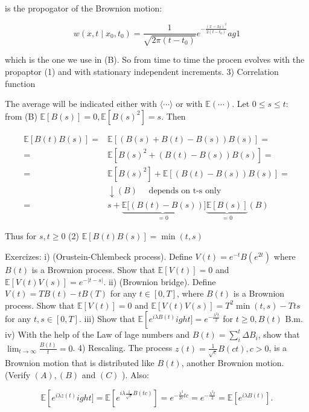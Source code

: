 is the propogator of the Brownion motion:


\begin{equation*} w\left(x, t \mid x_{0}, t_{0}\right)=\frac{1}{\sqrt{2 \pi\left(t-t_{0}\right)}} e^{-\frac{\left(x-x_{0}\right)^{2}}{2\left(t-t_{0}\right)}} 	ag{1}
\end{equation*} 


which is the one we use in (B). So from time to time the procen evolves with the propaptor (1) and with stationary independent increments.
3) Correlation function

The average will be indicated either with $\langle\cdots\rangle$ or with $\mathbb{E}(\cdots)$. Let $0 \leqslant s \leqslant t:$ from (B) $\mathbb{E}[B(s)]=0, \mathbb{E}
\left[B(s)^{2}\right]=s$. Then

$$ \begin{aligned}
\mathbb{E}[B(t) B(s)]= & \mathbb{E}[(B(s)+B(t)-B(s)) B(s)]=\\
= & \mathbb{E}
\left[B(s)^{2}+(B(t)-B(s)) B(s)\right]=\\
= & \mathbb{E}
\left[B(s)^{2}\right]+\mathbb{E}[(B(t)-B(s)) B(s)]=\\
& \downarrow(B) \quad \text { depends on t-s only }
\\
= & s+\underbrace{\mathbb{E}[(B(t)-B(s))}_{=0}] \underbrace{\mathbb{E}[B(s)]}_{=0}(B)
\end{aligned} $$

Thus for $s, t \geqslant 0$
(2) $\mathbb{E}[B(t) B(s)]=\min (t, s)$

Exercizes: i) (Orustein-Chlembeck process). Define $V(t)=e^{-t} B\left(e^{2 t}\right)$ where $B(t)$ is a Brownion process. Show that $\mathbb{E}[V(t)]=0$ and $\mathbb{E}[V(t) V(s)]=e^{-|t-s|}$.
ii) (Brownion bridge). Define $V(t)=T B(t)-t B(T)$ for any $t \in[0, T]$, where $B(t)$ is a Brownion process. Show that $\mathbb{E}[V(t)]=0$ and $\mathbb{E}[V(t) V(s)]=T^{2} \min (t, s)-T t s$ for any $t, s \in[0, T]$.
iii) Show that $\mathbb{E}
\left[e^{i \lambda B(t)}
ight]=e^{-\frac{\lambda^{2} t}{2}}$ for $t \geqslant 0, B(t)$ B.m.
iv) With the help of the Law of lage numbers and $B(t)=\sum_{i}^{t} \Delta B_{i}$, show that $\lim _{t \rightarrow \infty} \frac{B(t)}{t}=0$.
4) Rescaling. The process $z(t)=\frac{1}{\sqrt{c}} B(c t), c>0$, is a Brownion motion that is distributed like $B(t)$, another Brownion motion. (Verify $(A),(B)$ and $(C)$ ). Also:

$$ \mathbb{E}
\left[e^{i \lambda z(t)}
ight]=\mathbb{E}
\left[e^{i \lambda \frac{1}{\sqrt{c}} B(t c)}\right]=e^{-\frac{\lambda^{2}}{2 c} t c}=e^{-\frac{\lambda^{2} t}{2}}=\mathbb{E}
\left[e^{i \lambda B(t)}\right] .
$$ 

